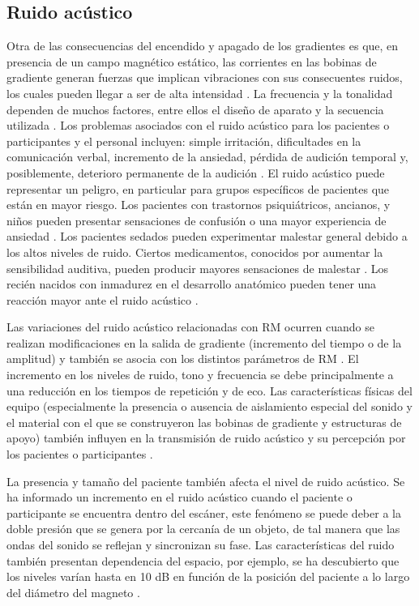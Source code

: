 \subsection{Ruido acústico}
Otra de las consecuencias del encendido y apagado de los gradientes es que, en presencia de un campo magnético estático, las corrientes en las bobinas de gradiente generan fuerzas que implican vibraciones con sus consecuentes ruidos, los cuales pueden llegar a ser de alta intensidad \cite{Shellock_2000}. La frecuencia y la tonalidad dependen de muchos factores, entre ellos el diseño de aparato y la secuencia utilizada \cite{Miyati_Banno_Fujita_Mase_Narita_Imazawa_Ohba_1999}. Los problemas asociados con el ruido acústico para los pacientes o participantes y el personal incluyen: simple irritación, dificultades en la comunicación verbal, incremento de la ansiedad, pérdida de audición temporal y, posiblemente, deterioro permanente de la audición \cite{McJuryPhD_ShellockPhD_2000,Hurwitz_Lane_Bell_Brant-Zawadzki_1989}. El ruido acústico puede representar un peligro, en particular para grupos específicos de pacientes que están en mayor riesgo. Los pacientes con trastornos psiquiátricos, ancianos, y niños pueden presentar sensaciones de confusión o una mayor experiencia de ansiedad \cite{Quirk_Letendre_Ciottone_Lingley}. Los pacientes sedados pueden experimentar malestar general debido a los altos niveles de ruido. Ciertos medicamentos, conocidos por aumentar la sensibilidad auditiva, pueden producir mayores sensaciones de malestar \cite{Laurell_1992}. Los recién nacidos con inmadurez en el desarrollo anatómico pueden tener una reacción mayor ante el ruido acústico \cite{Philbin_Taber_Hayman_1996}.

Las variaciones del ruido acústico relacionadas con RM ocurren cuando se realizan modificaciones en la salida de gradiente (incremento del tiempo o de la amplitud) y también se asocia con los distintos parámetros de RM \cite{McJuryPhD_ShellockPhD_2000,Counter_2000,Cho_Park_Kim_Chung_Chung_Chung_Moon_Yi_Sin_Wong_1997}. El incremento en los niveles de ruido, tono y frecuencia se debe principalmente a una reducción en los tiempos de repetición y de eco. Las características físicas del equipo (especialmente la presencia o ausencia de aislamiento especial del sonido y el material con el que se construyeron las bobinas de gradiente y estructuras de apoyo) también influyen en la transmisión de ruido acústico y su percepción por los pacientes o participantes \cite{Philbin_Taber_Hayman_1996}.

La presencia y tamaño del paciente también afecta el nivel de ruido acústico. Se ha informado un incremento en el ruido acústico cuando el paciente o participante se encuentra dentro del escáner, este fenómeno se puede deber a la doble presión que se genera por la cercanía de un objeto, de tal manera que las ondas del sonido se reflejan y sincronizan su fase. Las características del ruido también presentan dependencia del espacio, por ejemplo, se ha descubierto que los niveles varían hasta en 10 dB en función de la posición del paciente a lo largo del diámetro del magneto \cite{Hedeen_Edelstein_1997}.

